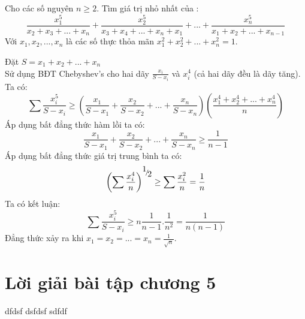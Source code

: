 \begin{baitap}
Cho các số nguyên $n \ge 2$. Tìm giá trị nhỏ nhất của :
$$\frac{{x_1^5 }}{{x_2  + x_3  + ... + x_n }} + \frac{{x_2^5 }}{{x_3  + x_4  + ... + x_n  + x_1 }} + ... + \frac{{x_n^5 }}{{x_1  + x_2  + ... + x_{n - 1} }}  $$
Với $x_1,x_2,...,x_n$ là các số thực thỏa mãn $x_1^2  + x_2^2  + ... + x_n^2  = 1$.


\begin{loigiai5}
 Đặt $S=x_1+x_2+...+x_n$\\
Sử dụng BĐT Chebyshev's cho hai dãy $\frac{{x_i }}{{S - x_i }}$ và $x_i^4 $ (cả hai dãy đều là dãy tăng). Ta có: 
$$ \sum {\frac{{x_i^5 }}{{S - x_i }} \ge \left( {\frac{{x_1 }}{{S - x_1 }} + \frac{{x_2 }}{{S - x_2 }} + ... + \frac{{x_n }}{{S - x_n }}} \right)} \left( {\frac{{x_1^4  + x_2^4  + ... + x_n^4 }}{n}} \right) $$
Áp dụng bất đẳng thức hàm lồi ta có:
$$\frac{{x_1 }}{{S - x_1 }} + \frac{{x_2 }}{{S - x_2 }} + ... + \frac{{x_n }}{{S - x_n }} \ge \frac{1}{{n - 1}}  $$
Áp dụng bất đẳng thức giá trị trung bình ta có:
$$ \left( {\sum {\frac{{x_i^4 }}{n}} } \right)^{{\raise0.7ex\hbox{$1$} \!\mathord{\left/
 {\vphantom {1 2}}\right.\kern-\nulldelimiterspace}
\!\lower0.7ex\hbox{$2$}}}  \ge \sum {\frac{{x_i^2 }}{n}}  = \frac{1}{n} $$
Ta có kết luận:
$$ \sum {\frac{{x_i^5 }}{{S - x_i }}}  \ge n\frac{1}{{n - 1}}.\frac{1}{{n^2 }} = \frac{1}{{n\left( {n - 1} \right)}} $$
Đẳng thức xảy ra khi $x_1  = x_2  = ... = x_n  = \frac{1}{{\sqrt n }}$.
\end{loigiai5}
\end{baitap}

\section{Lời giải bài tập chương 5}
{\small}


dfdsf
dsfdsf
sdfdf

